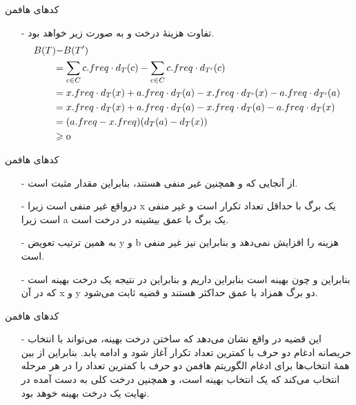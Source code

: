 \begin{frame}{‌کدهای هافمن}
\begin{itemize}\itemr
\item[-]
تفاوت هزینهٔ درخت
و
به صورت زیر خواهد بود.
\begin{align*}
\mathnormal{B(T)} & \mathnormal{- B(T')}\\
&\mathnormal{= \sum_{c \in C} c.freq \cdot d_T(c) - \sum_{c \in C} c.freq \cdot d_{T'}(c)}\\
&\mathnormal{= x.freq \cdot d_T(x) + a.freq \cdot d_T(a) - x.freq \cdot d_{T'}(x) - a.freq \cdot d_{T'}(a)}\\
&\mathnormal{= x.freq \cdot d_T(x) + a.freq \cdot d_T(a) - x.freq \cdot d_T(a) - a.freq \cdot d_T(x)}\\
&\mathnormal{= (a.freq - x.freq) (d_T(a) - d_T(x))}\\
&\mathnormal{\geqslant 0}
\end{align*}
\end{itemize}
\end{frame}


\begin{frame}{‌کدهای هافمن}
\begin{itemize}\itemr
\item[-]
از آنجایی که
و همچنین
غیر منفی هستند، بنابراین مقدار
مثبت است.
\item[-]
درواقع
غیر منفی است زیرا x یک برگ با حداقل تعداد تکرار است و
غیر منفی است زیرا a یک برگ با عمق بیشینه در درخت
است.
\item[-]
به همین ترتیب تعویض y و b هزینه را افزایش نمی‌دهد و بنابراین
نیز غیر منفی است.
\item[-]
بنابراین
و چون
بهینه است بنابراین داریم
و بنابراین
در نتیجه
یک درخت بهینه است که در آن x و y دو برگ همزاد با عمق حداکثر هستند و قضیه ثابت می‌شود.
\end{itemize}
\end{frame}


\begin{frame}{‌کدهای هافمن}
\begin{itemize}\itemr
\item[-]
این قضیه در واقع نشان می‌دهد که ساختن درخت بهینه، می‌تواند با انتخاب حریصانه ادغام دو حرف با کمترین تعداد تکرار آغاز شود و ادامه یابد. بنابراین از بین همهٔ انتخاب‌ها برای ادغام الگوریتم هافمن دو حرف با کمترین تعداد را در هر مرحله انتخاب می‌کند که یک انتخاب بهینه است، و همچنین درخت کلی به دست آمده در نهایت یک درخت بهینه خوهد بود.
\end{itemize}
\end{frame}


